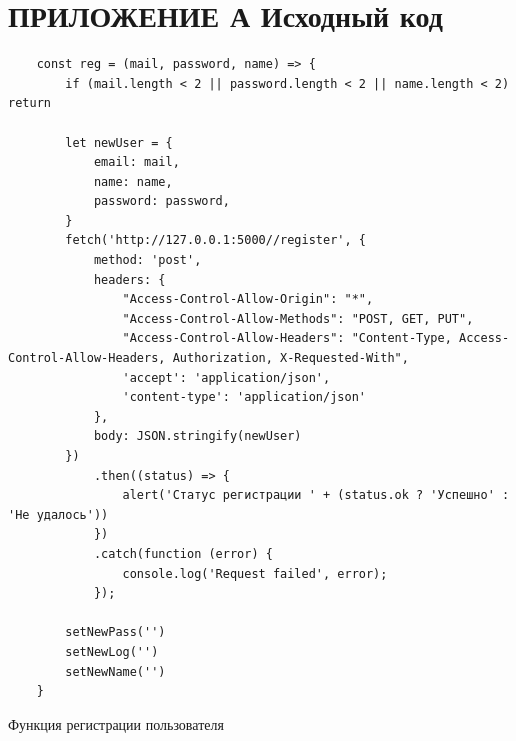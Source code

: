 \documentclass[14pt,final]{report}
\begin{document}
\chapter{ПРИЛОЖЕНИЕ А Исходный код}
\begin{listing}[!h]
\begin{verbatim}
    const reg = (mail, password, name) => {
        if (mail.length < 2 || password.length < 2 || name.length < 2) return

        let newUser = {
            email: mail,
            name: name,
            password: password,
        }
        fetch('http://127.0.0.1:5000//register', {
            method: 'post',
            headers: {
                "Access-Control-Allow-Origin": "*",
                "Access-Control-Allow-Methods": "POST, GET, PUT",
                "Access-Control-Allow-Headers": "Content-Type, Access-Control-Allow-Headers, Authorization, X-Requested-With",
                'accept': 'application/json',
                'content-type': 'application/json'
            },
            body: JSON.stringify(newUser)
        })
            .then((status) => {
                alert('Статус регистрации ' + (status.ok ? 'Успешно' : 'Не удалось'))
            })
            .catch(function (error) {
                console.log('Request failed', error);
            });
        
        setNewPass('')
        setNewLog('')
        setNewName('')
    }
\end{verbatim}
\caption{Функция регистрации пользователя}
\label{register}
\end{listing}
\end{document}
